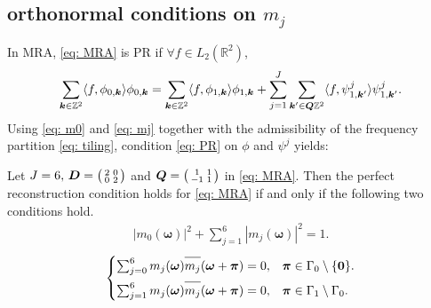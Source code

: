 \subsection{orthonormal conditions on $m_j$}\label{subsec: northonormal cond}
In MRA, \eqref{eq: MRA} is PR if $\forall f\in L_2(\mathbb{R}^2)$,
\begin{equation}
\sum_{\boldsymbol{k}\in\mathbb{Z}^2}\langle f,\phi_{0,\boldsymbol{k}}\rangle\phi_{0,\boldsymbol{k}} = \sum_{\boldsymbol{k}\in\mathbb{Z}^2}\langle f,\phi_{1,\boldsymbol{k}}\rangle\phi_{1,\boldsymbol{k}} + \sum_{j=1}^J\sum_{\boldsymbol{k}'\in\boldsymbol{Q}\mathbb{Z}^2}\langle f,\psi^{j}_{1,\boldsymbol{k}'}\rangle\psi^j_{1,\boldsymbol{k}'}.\label{eq: PR}
\end{equation}
Using \eqref{eq: m0} and \eqref{eq: mj} together with the admissibility of the frequency partition \eqref{eq: tiling}, condition \eqref{eq: PR} on $\phi$ and $\psi^j$ yields:
\begin{thm}\label{thm: conds}
Let $J=6,\, \boldsymbol{D} =\bigl(\begin{smallmatrix} 2&0\\0&2\end{smallmatrix}\bigr)$ and $\boldsymbol{Q}=\bigl(\begin{smallmatrix} 1&1\\-1&1\end{smallmatrix}\bigr)$ in \eqref{eq: MRA}.
Then the perfect reconstruction condition holds for \eqref{eq: MRA} if and only if the following two conditions hold.
\begin{align}\label{eq: id-sum}
|m_0(\boldsymbol{\omega})|^2 + \sum_{j = 1}^6|m_j(\boldsymbol{\omega})|^2 = 1.
\end{align}
\begin{equation}\label{eq: shift-cancel}
 \begin{cases}
\sum_{j = 0}^6m_j(\boldsymbol{\omega})\overlinespace{m_j}(\boldsymbol{\omega} + \boldsymbol{\pi}) = 0, & \boldsymbol{\pi}\in \Gamma_0\setminus\{\boldsymbol{0}\}.\\[.5em]
\sum_{j=1}^6m_j(\boldsymbol{\omega})\overlinespace{m_j}(\boldsymbol{\omega}+\boldsymbol{\pi}) = 0, & \boldsymbol{\pi}\in\Gamma_1\setminus\Gamma_0.
\end{cases}
\end{equation}
\end{thm}

